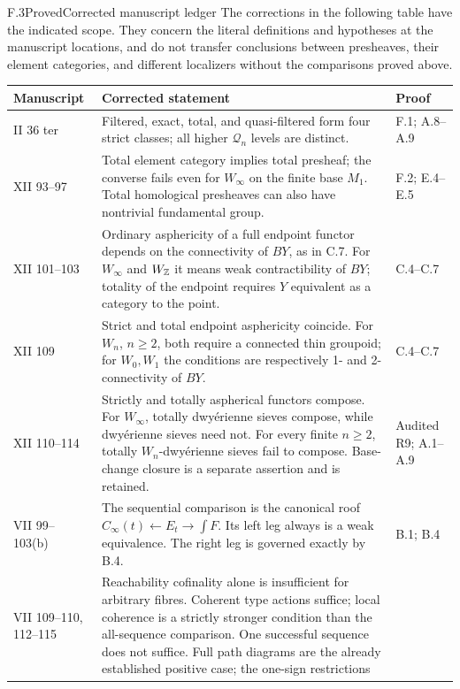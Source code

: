 \begin{claim}{F.3}{Proved}{Corrected manuscript ledger}
\label{F:manuscript-ledger}
The corrections in the following table have the indicated
scope. They concern the literal definitions and hypotheses at
the manuscript locations, and do not transfer conclusions
between presheaves, their element categories, and different
localizers without the comparisons proved above.
\end{claim}
\begin{center}
\small
\begin{longtable}{p{25mm}p{96mm}p{20mm}}
\toprule
Manuscript & Corrected statement & Proof\\
\midrule
\endhead
II 36 ter & Filtered, exact, total, and quasi-filtered form four
strict classes; all higher $\mathcal Q_n$ levels are distinct.
& F.1; A.8--A.9\\
XII 93--97 & Total element category implies total presheaf;
the converse fails even for $W_\infty$ on the finite base $M_1$.
Total homological presheaves can also have nontrivial fundamental group.
& F.2; E.4--E.5\\
XII 101--103 & Ordinary asphericity of a full endpoint functor
depends on the connectivity of $BY$, as in C.7. For $W_\infty$
and $W_{\mathbb Z}$ it means weak contractibility of $BY$; totality of
the endpoint requires $Y$ equivalent as a category to the point.
& C.4--C.7\\
XII 109 & Strict and total endpoint asphericity coincide. For
$W_n$, $n\geq2$, both require a connected thin groupoid; for
$W_0,W_1$ the conditions are respectively 1- and 2-connectivity of $BY$.
& C.4--C.7\\
XII 110--114 & Strictly and totally aspherical functors compose.
For $W_\infty$, totally dwy\'erienne sieves compose, while
dwy\'erienne sieves need not. For every finite $n\geq2$, totally
$W_n$-dwy\'erienne sieves fail to compose. Base-change closure
is a separate assertion and is retained.
& Audited R9; A.1--A.9\\
VII 99--103(b) & The sequential comparison is the canonical
roof $C_\infty(t)\leftarrow E_t\to\int F$. Its left leg always
is a weak equivalence. The right leg is governed exactly by B.4.
& B.1; B.4\\
VII 109--110,
112--115 & Reachability cofinality alone is insufficient for
arbitrary fibres. Coherent type actions suffice; local coherence
is a strictly stronger condition than the all-sequence comparison.
One successful sequence does not suffice. Full path diagrams are
the already established positive case; the one-sign restrictions

\end{longtable}
\end{center}
